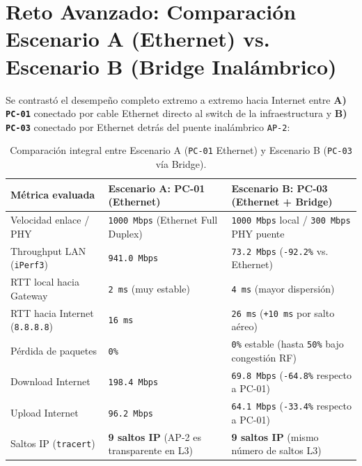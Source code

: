 \documentclass[11pt, a4paper]{article}
\begin{document}
\section{Reto Avanzado: Comparación Escenario A (Ethernet) vs. Escenario B (Bridge Inalámbrico)}

Se contrastó el desempeño completo extremo a extremo hacia Internet entre \textbf{A) \texttt{PC-01}} conectado por cable Ethernet directo al switch de la infraestructura y \textbf{B) \texttt{PC-03}} conectado por Ethernet detrás del puente inalámbrico \texttt{AP-2}:

\begin{table}[h!]
\centering
\small
\setlength{\tabcolsep}{4.5pt}
\caption{Comparación integral entre Escenario A (\texttt{PC-01} Ethernet) y Escenario B (\texttt{PC-03} vía Bridge).}
\begin{tabularx}{\textwidth}{>{\raggedright\arraybackslash}p{3.6cm} >{\centering\arraybackslash}X >{\centering\arraybackslash}X}
\toprule
\textbf{Métrica evaluada} & \textbf{Escenario A: PC-01 (Ethernet)} & \textbf{Escenario B: PC-03 (Ethernet + Bridge)} \\
\midrule
Velocidad enlace / PHY & \texttt{1000 Mbps} (Ethernet Full Duplex) & \texttt{1000 Mbps} local / \texttt{300 Mbps} PHY puente \\
Throughput LAN (\texttt{iPerf3}) & \texttt{941.0 Mbps} & \texttt{73.2 Mbps} (\texttt{-92.2\%} vs. Ethernet) \\
RTT local hacia Gateway & \texttt{2 ms} (muy estable) & \texttt{4 ms} (mayor dispersión) \\
RTT hacia Internet (\texttt{8.8.8.8}) & \texttt{16 ms} & \texttt{26 ms} (\texttt{+10 ms} por salto aéreo) \\
Pérdida de paquetes & \texttt{0\%} & \texttt{0\%} estable (hasta \texttt{50\%} bajo congestión RF) \\
Download Internet & \texttt{198.4 Mbps} & \texttt{69.8 Mbps} (\texttt{-64.8\%} respecto a PC-01) \\
Upload Internet & \texttt{96.2 Mbps} & \texttt{64.1 Mbps} (\texttt{-33.4\%} respecto a PC-01) \\
Saltos IP (\texttt{tracert}) & \textbf{9 saltos IP} (AP-2 es transparente en L3) & \textbf{9 saltos IP} (mismo número de saltos L3) \\
\bottomrule
\end{tabularx}
\end{table}
\end{document}
